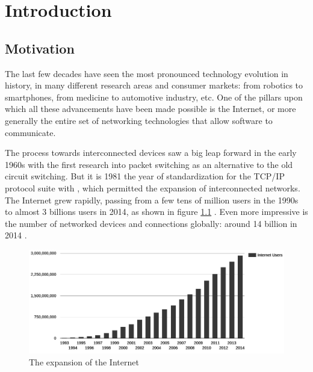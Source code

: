 \chapter{Introduction}
\label{chap:introduction}

\section{Motivation}
The last few decades have seen the most pronounced technology evolution in history, in many different research areas and consumer markets: from robotics to smartphones, from medicine to automotive industry, etc. One of the pillars upon which all these advancements have been made possible is the Internet, or more generally the entire set of networking technologies that allow software to communicate. 


The process towards interconnected devices saw a big leap forward in the early 1960s with the first research into packet switching as an alternative to the old circuit switching. But it is 1981 the year of standardization for the TCP/IP protocol suite with , which permitted the expansion of interconnected networks. The Internet grew rapidly, passing from a few tens of million users in the 1990s to almost 3 billions users in 2014, as shown in figure \ref{fig:internet_growth} \cite{internetlivestats}. Even more impressive is the number of networked devices and connections globally: around 14 billion in 2014 \cite{cisco}.

\begin{figure}[!htb]
\centering
\includegraphics[width=\textwidth]{images/internet_growth}
\caption{The expansion of the Internet}
\label{fig:internet_growth}
\end{figure}

